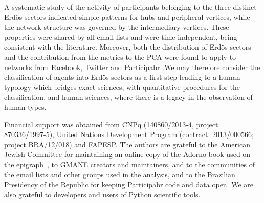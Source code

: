 \documentclass[%
	aip,
	jmp,%
	amsmath,amssymb,
	reprint,%
]{revtex4-1}
\begin{document}
A systematic study of the activity of participants belonging to the three distinct Erd\"os sectors indicated simple patterns for hubs and peripheral vertices, while the network structure was governed by the intermediary vertices. These properties were shared by all email lists and were time-independent, being consistent with the literature. Moreover, both the distribution of Erd\"os sectors and the contribution from the metrics to the PCA were found to apply to networks from Facebook, Twitter and Participabr. We may therefore consider the classification of agents into Erd\"os sectors as a first step leading to a human typology which bridges exact sciences, with quantitative procedures for the classification, and human sciences, where there is a legacy in the observation of human types. 


\begin{acknowledgments}
	Financial support was obtained from CNPq (140860/2013-4,
	project 870336/1997-5), United Nations Development Program (contract: 2013/000566; project BRA/12/018) and FAPESP. 
	The authors are grateful to the American Jewish Committee for maintaining an online copy of the Adorno book used on the epigraph~\cite{adorno}, to GMANE creators and maintainers, and to the communities of the email lists and other groups used in the analysis, and to the Brazilian Presidency of the Republic for keeping Participabr code and data open.
	We are also grateful to developers and users of Python scientific tools.
\end{acknowledgments}


\end{document}
